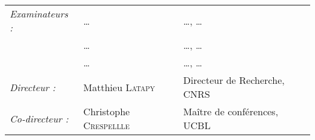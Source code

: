 \begin{center}
\begin{tabular}{lll}
\textit{Examinateurs :} & \ldots & \ldots, \ldots\\
& \ldots & \ldots, \ldots\\
& \ldots & \ldots, \ldots\\
\textit{Directeur :}	  	& Matthieu \textsc{Latapy}       & Directeur de
Recherche, CNRS\\
\textit{Co-directeur :} 	& Christophe \textsc{Crespellle} & Maître de
conférences, UCBL\\
\end{tabular}
\end{center}


\addtolength{\oddsidemargin}{5mm}
\addtolength{\textwidth}{-3mm}
\addtolength{\topmargin}{19mm}
